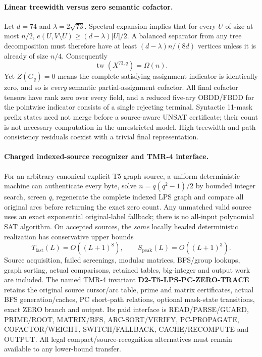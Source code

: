 \documentclass[11pt]{article}
\begin{document}
\paragraph{Linear treewidth versus zero semantic cofactor.}
Let $d=74$ and $\lambda=2\sqrt{73}$. Spectral
expansion implies that for every $U$ of size
at most $n/2$,
$e(U,V\setminus U)\ge(d-\lambda)|U|/2$.
A balanced separator from any tree decomposition
must therefore have at least
$(d-\lambda)n/(8d)$ vertices unless it is
already of size $n/4$. Consequently
\[
\operatorname{tw}(X^{73,q})=\Omega(n).
\]
Yet $Z(G_q)=0$ means the complete satisfying-assignment
indicator is identically zero, and so is \emph{every}
semantic partial-assignment cofactor. All final
cofactor tensors have rank zero over every field,
and a reduced five-ary OBDD/FBDD for the pointwise
indicator consists of a single rejecting terminal.
Syntactic 11-mask prefix states need not merge
before a source-aware UNSAT certificate; their
count is not necessary computation in the
unrestricted model. High treewidth and
path-consistency residuals coexist with a trivial
final representation.

\paragraph{Charged indexed-source recognizer and TMR-4 interface.}
For an arbitrary canonical explicit T5 graph source,
a uniform deterministic machine can authenticate
every byte, solve $n=q(q^2-1)/2$ by bounded integer
search, screen $q$, regenerate the complete indexed
LPS graph and compare all original arcs before
returning the exact zero count. Any unmatched
valid source uses an exact exponential original-label
fallback; there is no all-input polynomial SAT
algorithm. On accepted sources, the \emph{same}
locally headed deterministic realization has
conservative upper bounds
\[
T_{\mathrm{fast}}(L)=O((L+1)^8),\qquad
S_{\mathrm{peak}}(L)=O((L+1)^3).
\]
Source acquisition, failed screenings, modular
matrices, BFS/group lookups, graph sorting, actual
comparisons, retained tables, big-integer and output
work are included. The named TMR-4 invariant
\textbf{D2-T5-LPS-PC-ZERO-TRACE} retains the original
source cursor/arc table, prime and matrix certificates,
actual BFS generation/caches, PC short-path relations,
optional mask-state transitions, exact ZERO branch
and output. Its paid interface is
READ/PARSE/GUARD, PRIME/ROOT, MATRIX/BFS,
ARC-SORT/VERIFY, PC-PROPAGATE, COFACTOR/WEIGHT,
SWITCH/FALLBACK, CACHE/RECOMPUTE and OUTPUT.
All legal compact/source-recognition alternatives
must remain available to any lower-bound transfer.
\end{document}
